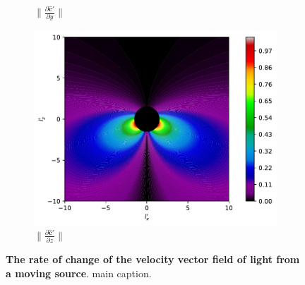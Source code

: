 \begin{figure}[H]
\begin{subfigure}{0.32\textwidth}
		\caption{$\|\frac{\partial \mathbf{\hat{c}}'}{\partial y}\|$}
		\label{fig: Rate of change of lights velocity field subfig_2}
	\end{subfigure}
	\begin{subfigure}{0.32\textwidth}
		\centering
		\includegraphics[width=\textwidth]{images/pdf/Rate_of_change_of_lights_velocity_field_with_respect_to_z.pdf}
		\caption{$\|\frac{\partial \mathbf{\hat{c}}'}{\partial z}\|$}
		\label{fig: Rate of change of lights velocity field subfig_3}
	\end{subfigure}
	\caption{\textbf{The rate of change of the velocity vector field of light from a moving source}. main caption.}
	\label{fig: Rate of change of lights velocity field}
\end{figure}

